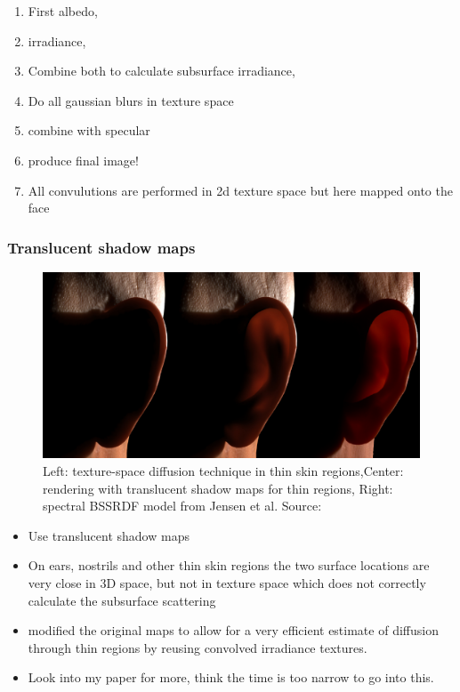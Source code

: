 \documentclass[ngerman,runningheads,a4paper]{llncs}[2018/03/10]
\begin{document}
\begin{enumerate}
  \item First albedo,
  \item irradiance,
  \item Combine both to calculate subsurface irradiance,
  \item Do all gaussian blurs in texture space
  \item combine with specular
  \item produce final image!
  \item All convulutions are performed in 2d texture space but here mapped onto the face
\end{enumerate}

\subsubsection{Translucent shadow maps}
\label{sub:translucent-shadow-maps}

\begin{figure}
  \includegraphics[scale=0.2,keepaspectratio]{./images/translucent-shadow-maps.jpg}
  \caption{
    Left: texture-space diffusion technique in thin skin regions,Center: rendering with translucent shadow maps for thin regions, Right: spectral BSSRDF model from Jensen et al. Source: \citet{efficient-human-skin-rendering}
  }
\end{figure}

\citet{translucent-shadow-maps}

\begin{itemize}
  \item Use translucent shadow maps
  \item On ears, nostrils and other thin skin regions the two surface locations are very close in 3D space, but not in texture space which does not correctly calculate the subsurface scattering
  \item \citeauthor{efficient-human-skin-rendering} modified the original maps to allow for a very efficient estimate of diffusion through thin regions by reusing convolved irradiance textures.
  \item Look into my paper for more, think the time is too narrow to go into this.
\end{itemize}
\end{document}
